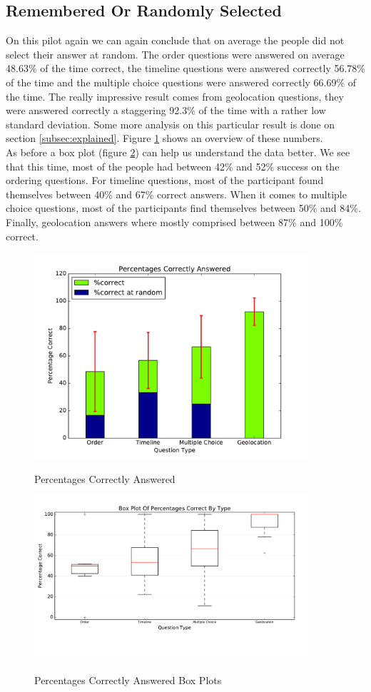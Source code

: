 \subsection{Remembered Or Randomly Selected}\label{sec:p2remem}
On this pilot again we can again conclude that on average the people did not select their answer at random. The order questions were answered on average 48.63\% of the time correct, the timeline questions were answered correctly 56.78\% of the time and the multiple choice questions were answered correctly 66.69\% of the time. The really impressive result comes from geolocation questions, they were answered correctly a staggering 92.3\% of the time with a rather low standard deviation. Some more analysis on this particular result is done on section \ref{subsec:explained}. Figure \ref{fig:p2Correct} shows an overview of these numbers.\\
As before a box plot (figure \ref{fig:p2Boxes}) can help us understand the data better. We see that this time, most of the people had between 42\% and 52\% success on the ordering questions. For timeline questions, most of the participant found themselves between 40\% and 67\% correct answers. When it comes to multiple choice questions, most of the participants find themselves between 50\% and 84\%. Finally, geolocation answers where mostly comprised between 87\% and 100\% correct.

\begin{figure}
\centering
{\includegraphics[width=4in]{images/pilot_2_correct.pdf}}
\caption{Percentages Correctly Answered}
\label{fig:p2Correct}
\end{figure}
\begin{figure}
\centering
{\includegraphics[width=4in]{images/pilot_2_boxplot.pdf}}
\caption{Percentages Correctly Answered Box Plots}
\label{fig:p2Boxes}
\end{figure}

